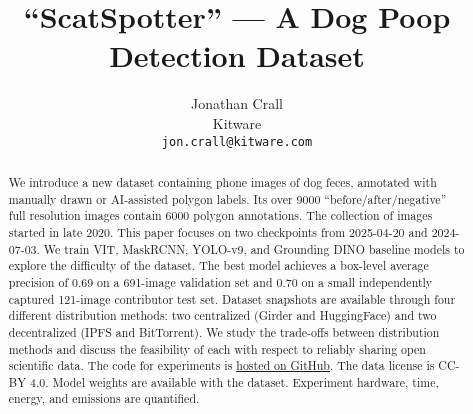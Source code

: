 \documentclass[10pt,twocolumn,letterpaper]{article}
\title{``ScatSpotter'' --- A Dog Poop Detection Dataset}
\author{Jonathan Crall\\
Kitware\\
\texttt{jon.crall@kitware.com} \\
}
\newcommand{\repoBase}{https://github.com/Erotemic/scatspotter/blob/31f497e2586f0d1560b9bbd65415f9bd36a07585}
\newcommand{\repoBase}{https://anonymous.4open.science/r/scatspotter-DD67}
\begin{document}
\maketitle

\begin{abstract}

We introduce a new dataset containing phone images of dog feces, annotated with manually drawn or AI-assisted polygon labels.  Its over 9000 ``before/after/negative'' full resolution images contain 6000 polygon annotations.  The collection of images started in late 2020.  This paper focuses on two checkpoints from 2025-04-20 and 2024-07-03.  We train VIT, MaskRCNN, YOLO-v9, and Grounding DINO baseline models to explore the difficulty of the dataset.  The best model achieves a box-level average precision of 0.69 on a 691-image validation set and 0.70 on a small independently captured 121-image contributor test set.  Dataset snapshots are available through four different distribution methods: two centralized (Girder and HuggingFace) and two decentralized (IPFS and BitTorrent).  We study the trade-offs between distribution methods and discuss the feasibility of each with respect to reliably sharing open scientific data.  The code for experiments is \href{\repoBase}{hosted on GitHub}.  The data license is CC-BY 4.0.  Model weights are available with the dataset.  Experiment hardware, time, energy, and emissions are quantified.


\end{abstract}





\ifwacv
\else
\FloatBarrier
\fi



\ifwacv
\FloatBarrier
\else
\fi

{\small


}


\ifuseappendix

%
\fi
\end{document}
